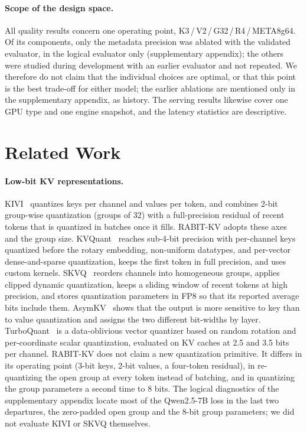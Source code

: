 \documentclass{article}
\begin{document}
\paragraph{Scope of the design space.}
All quality results concern one operating point, K3\,/\,V2\,/\,G32\,/\,R4\,/\,META8g64. Of its
components, only the metadata precision was ablated with the validated evaluator, in the logical
evaluator only (supplementary appendix); the others were studied during development with an earlier
evaluator and not repeated. We therefore do not claim that the individual choices are optimal, or that this point
is the best trade-off for either model; the earlier ablations are mentioned only in the supplementary appendix, as history.
The serving results likewise cover one GPU type and one engine snapshot, and the latency statistics
are descriptive.

\section{Related Work}
\label{sec:related}

\paragraph{Low-bit KV representations.}
KIVI~\citep{liu2024kivi} quantizes keys per channel and values per token, and combines 2-bit
group-wise quantization (groups of 32) with a full-precision residual of recent
tokens that is quantized in batches once it fills. RABIT-KV adopts these axes and the group size.
KVQuant~\citep{hooper2024kvquant} reaches sub-4-bit precision with per-channel keys quantized before
the rotary embedding, non-uniform datatypes, and per-vector dense-and-sparse quantization, keeps the
first token in full precision, and uses custom kernels. SKVQ~\citep{duanmu2024skvq} reorders channels
into homogeneous groups, applies clipped dynamic quantization, keeps a sliding window of recent tokens
at high precision, and stores quantization parameters in FP8 so that its reported average bits include
them. AsymKV~\citep{tao2024asymkv} shows that the output is more sensitive to key than to value
quantization and assigns the two different bit-widths by layer. TurboQuant~\citep{zandieh2025turboquant}
is a data-oblivious vector quantizer based on random rotation and per-coordinate scalar quantization,
evaluated on KV caches at 2.5 and 3.5 bits per channel. RABIT-KV does not claim a new
quantization primitive. It differs in its operating point (3-bit keys, 2-bit values, a four-token residual), in
re-quantizing the open group at every token instead of batching, and in quantizing the group parameters
a second time to 8 bits. The logical diagnostics of the supplementary appendix locate most of the
Qwen2.5-7B loss in the last two departures, the zero-padded open group and the 8-bit group parameters;
we did not evaluate KIVI or SKVQ themselves.
\end{document}
